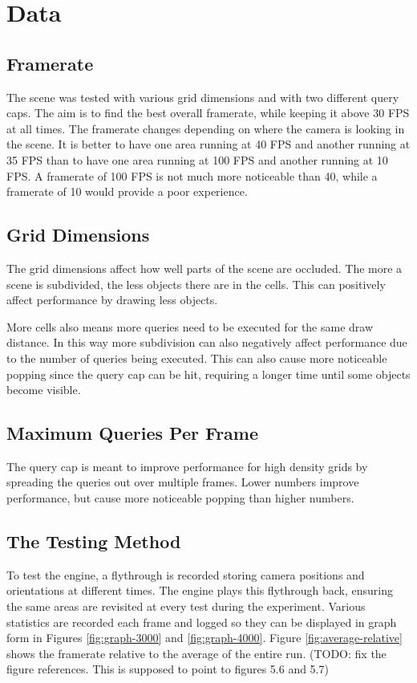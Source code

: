 \documentclass[12pt]{ucthesis}
\begin{document}
\section{Data}
\label{data}

\subsection{Framerate}
\label{framerate}

The scene was tested with various grid dimensions and with two different query caps.
The aim is to find the best overall framerate, while keeping it above 30 FPS at all times.
The framerate changes depending on where the camera is looking in the scene.
It is better to have one area running at 40 FPS and another running at 35 FPS than to have one area running at 100 FPS and another running at 10 FPS.
A framerate of 100 FPS is not much more noticeable than 40, while a framerate of 10 would provide a poor experience.

\subsection{Grid Dimensions}
\label{grid-dimensions}
The grid dimensions affect how well parts of the scene are occluded.
The more a scene is subdivided, the less objects there are in the cells.
This can positively affect performance by drawing less objects.

More cells also means more queries need to be executed for the same draw distance.
In this way more subdivision can also negatively affect performance due to the number of queries being executed.
This can also cause more noticeable popping since the query cap can be hit, requiring a longer time until some objects become visible.

\subsection{Maximum Queries Per Frame}
\label{maximum-queries-per-frame}
The query cap is meant to improve performance for high density grids by spreading the queries out over multiple frames.
Lower numbers improve performance, but cause more noticeable popping than higher numbers.

\subsection{The Testing Method}
\label{the-testing-method}
To test the engine, a flythrough is recorded storing camera positions and orientations at different times.
The engine plays this flythrough back, ensuring the same areas are revisited at every test during the experiment.
Various statistics are recorded each frame and logged so they can be displayed in graph form in Figures \ref{fig:graph-3000} and \ref{fig:graph-4000}.
Figure \ref{fig:average-relative} shows the framerate relative to the average of the entire run.
(TODO: fix the figure references.  This is supposed to point to figures 5.6 and 5.7)
\end{document}
